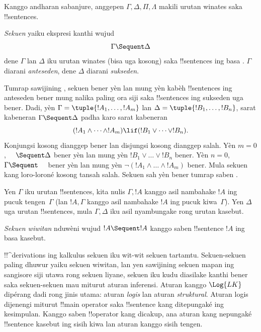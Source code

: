 \documentclass[../../../include/open-logic-section]{subfiles}
\begin{document}
      {}
      {}


Kanggo andharan sabanjure, anggepen $\Gamma, \Delta, \Pi, \Lambda$
makili urutan winates saka !!{sentence}s.

\begin{defn}[Sekuen]
\emph{Sekuen} yaiku ekspresi kanthi wujud
\[
\Gamma \Sequent \Delta
\]
dene $\Gamma$ lan $\Delta$ iku urutan winates (bisa uga kosong)
saka !!{sentence}s ing basa . $\Gamma$ diarani
\emph{anteseden}, dene $\Delta$ diarani \emph{sukseden}.
\end{defn}

\begin{explain}
Tumrap sawijining , sekuen bener yèn lan mung yèn
kabèh !!{sentence}s ing anteseden bener mung nalika paling ora siji
saka !!{sentence}s ing sukseden uga bener. Dadi, yèn
$\Gamma = \tuple{!A_1, \dots, !A_m}$ lan
$\Delta = \tuple{!B_1, \dots, !B_n}$, sarat kabeneran
$\Gamma \Sequent \Delta$ padha karo sarat kabeneran
\[
(!A_1 \land \cdots \land !A_m) \lif (!B_1 \lor \cdots \lor !B_n).
\]
Konjungsi kosong dianggep bener lan disjungsi kosong dianggep salah.
Yèn $m=0$, $\quad\Sequent \Delta$ bener yèn lan mung yèn
$!B_1 \lor \dots \lor !B_n$ bener. Yèn $n=0$,
$\Gamma \Sequent \quad$ bener yèn lan mung yèn
$\lnot(!A_1 \land \dots \land !A_m)$ bener. Mula sekuen kang
loro-loroné kosong tansah salah. Sekuen sah yèn bener tumrap
saben .
\end{explain}

Yen $\Gamma$ iku urutan !!{sentence}s, kita nulis $\Gamma, !A$ kanggo
asil nambahake $!A$ ing pucuk tengen~$\Gamma$ (lan $!A, \Gamma$
kanggo asil nambahake $!A$ ing pucuk kiwa~$\Gamma$). Yen $\Delta$ uga
urutan !!{sentence}s, mula $\Gamma, \Delta$ iku asil nyambungake rong
urutan kasebut.

\begin{defn}
\emph{Sekuen wiwitan} nduwèni wujud $!A \Sequent !A$ kanggo
saben !!{sentence} $!A$ ing basa kasebut.
\end{defn}

!!^{derivation}s ing kalkulus sekuen iku wit-wit sekuen tartamtu.
Sekuen-sekuen paling dhuwur yaiku sekuen wiwitan, lan yen sawijining
sekuen mapan ing sangisore siji utawa rong sekuen liyane, sekuen iku
kudu diasilake kanthi bener saka sekuen-sekuen mau miturut aturan
inferensi. Aturan kanggo
$\Log{LK}$ dipérang dadi rong jinis utama: aturan \emph{logis} lan
aturan \emph{struktural}. Aturan logis dijenengi miturut !!{main
  operator} saka !!{sentence} kang ditepungaké ing kesimpulan.
Kanggo saben !!{operator} kang dicakup, ana aturan kang nepungaké
!!{sentence} kasebut ing sisih kiwa lan aturan kanggo sisih tengen.
\end{document}
